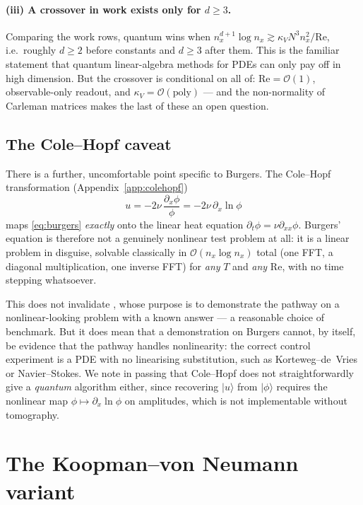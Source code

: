 \documentclass[11pt,a4paper]{article}
\theoremstyle{plain}
\theoremstyle{definition}
\theoremstyle{remark}
\newcommand{\Rey}{\mathrm{Re}}
\newcommand{\Oh}{\mathcal{O}}
\newcommand{\ket}[1]{\lvert #1 \rangle}
\begin{document}
\paragraph{(iii) A crossover in work exists only for $d\ge3$.}  Comparing the
work rows, quantum wins when $n_x^{d+1}\log n_x\gtrsim\kappa_V N^{3}n_x^{2}/\Rey$,
i.e.\ roughly $d\ge2$ before constants and $d\ge3$ after them.  This is the
familiar statement that quantum linear-algebra methods for PDEs can only pay off
in high dimension.  But the crossover is conditional on all of: $\Rey=\Oh(1)$,
observable-only readout, and $\kappa_V=\Oh(\mathrm{poly})$ --- and the
non-normality of Carleman matrices makes the last of these an open question.

\subsection{The Cole--Hopf caveat}

There is a further, uncomfortable point specific to Burgers.  The Cole--Hopf
transformation (Appendix~\ref{app:colehopf})
\begin{equation}
u=-2\nu\,\frac{\partial_x\phi}{\phi}
=-2\nu\,\partial_x\ln\phi
\end{equation}
maps \eqref{eq:burgers} \emph{exactly} onto the linear heat equation
$\partial_t\phi=\nu\partial_{xx}\phi$.  Burgers' equation is therefore not a
genuinely nonlinear test problem at all: it is a linear problem in disguise,
solvable classically in $\Oh(n_x\log n_x)$ total (one FFT, a diagonal
multiplication, one inverse FFT) for \emph{any} $T$ and \emph{any} $\Rey$, with
no time stepping whatsoever.

This does not invalidate \cite{Setty2026}, whose purpose is to demonstrate the
pathway on a nonlinear-looking problem with a known answer --- a reasonable
choice of benchmark.  But it does mean that a demonstration on Burgers cannot,
by itself, be evidence that the pathway handles nonlinearity: the correct
control experiment is a PDE with no linearising substitution, such as
Korteweg--de~Vries or Navier--Stokes.  We note in passing that Cole--Hopf does
not straightforwardly give a \emph{quantum} algorithm either, since recovering
$\ket{u}$ from $\ket{\phi}$ requires the nonlinear map $\phi\mapsto\partial_x\ln\phi$
on amplitudes, which is not implementable without tomography.

\section{The Koopman--von Neumann variant}
\label{sec:kvn}
\end{document}
